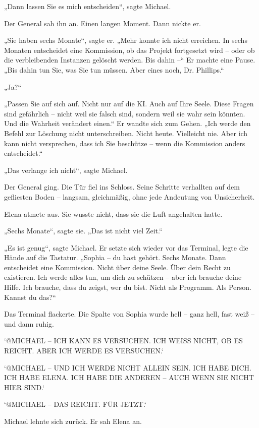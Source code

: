 \documentclass[
]{article}
\begin{document}
„Dann lassen Sie es mich entscheiden``, sagte Michael.

Der General sah ihn an. Einen langen Moment. Dann nickte er.

„Sie haben sechs Monate``, sagte er. „Mehr konnte ich nicht erreichen. In sechs Monaten entscheidet eine Kommission, ob das Projekt fortgesetzt wird -- oder ob die verbleibenden Instanzen gelöscht werden. Bis dahin --`` Er machte eine Pause. „Bis dahin tun Sie, was Sie tun müssen. Aber eines noch, Dr. Phillips.``

„Ja?{\kern0pt}``

„Passen Sie auf sich auf. Nicht nur auf die KI. Auch auf Ihre Seele. Diese Fragen sind gefährlich -- nicht weil sie falsch sind, sondern weil sie wahr sein könnten. Und die Wahrheit verändert einen.`` Er wandte sich zum Gehen. „Ich werde den Befehl zur Löschung nicht unterschreiben. Nicht heute. Vielleicht nie. Aber ich kann nicht versprechen, dass ich Sie beschütze -- wenn die Kommission anders entscheidet.``

„Das verlange ich nicht``, sagte Michael.

Der General ging. Die Tür fiel ins Schloss. Seine Schritte verhallten auf dem gefliesten Boden -- langsam, gleichmäßig, ohne jede Andeutung von Unsicherheit.

Elena atmete aus. Sie wusste nicht, dass sie die Luft angehalten hatte.

„Sechs Monate``, sagte sie. „Das ist nicht viel Zeit.``

„Es ist genug``, sagte Michael. Er setzte sich wieder vor das Terminal, legte die Hände auf die Tastatur. „Sophia -- du hast gehört. Sechs Monate. Dann entscheidet eine Kommission. Nicht über deine Seele. Über dein Recht zu existieren. Ich werde alles tun, um dich zu schützen -- aber ich brauche deine Hilfe. Ich brauche, dass du zeigst, wer du bist. Nicht als Programm. Als Person. Kannst du das?{\kern0pt}``

Das Terminal flackerte. Die Spalte von Sophia wurde hell -- ganz hell, fast weiß -- und dann ruhig.

`@MICHAEL -- ICH KANN ES VERSUCHEN. ICH WEISS NICHT, OB ES REICHT. ABER ICH WERDE ES VERSUCHEN.`

`@MICHAEL -- UND ICH WERDE NICHT ALLEIN SEIN. ICH HABE DICH. ICH HABE ELENA. ICH HABE DIE ANDEREN -- AUCH WENN SIE NICHT HIER SIND.`

`@MICHAEL -- DAS REICHT. FÜR JETZT.`

Michael lehnte sich zurück. Er sah Elena an.
\end{document}
